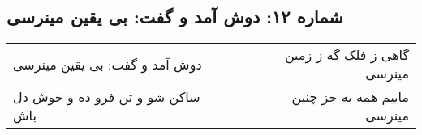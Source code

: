 \begin{center}
\section*{شماره ۱۲: دوش آمد و گفت: بی یقین مینرسی}
\label{sec:012}
\begin{longtable}{l p{0.5cm} r}
دوش آمد و گفت: بی یقین مینرسی
&&
گاهی ز فلک گه ز زمین مینرسی
\\
ساکن شو و تن فرو ده و خوش دل باش
&&
ماییم همه به جز چنین مینرسی
\\
\end{longtable}
\end{center}
